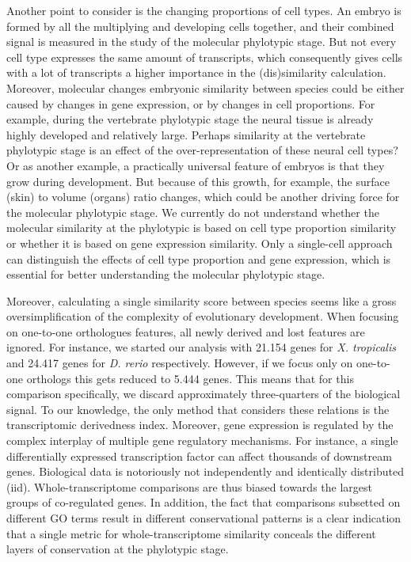 Another point to consider is the changing proportions of cell types. An embryo is formed by all the multiplying and developing cells together, and their combined signal is measured in the study of the molecular phylotypic stage. But not every cell type expresses the same amount of transcripts\cite{Kim2023, Percharde2017}, which consequently gives cells with a lot of transcripts a higher importance in the (dis)similarity calculation. Moreover, molecular changes embryonic similarity between species could be either caused by changes in gene expression, or by changes in cell proportions. For example, during the vertebrate phylotypic stage the neural tissue is already highly developed and relatively large. Perhaps similarity at the vertebrate phylotypic stage is an effect of the over-representation of these neural cell types? Or as another example, a practically universal feature of embryos is that they grow during development. But because of this growth, for example, the surface (skin) to volume (organs) ratio changes, which could be another driving force for the molecular phylotypic stage. We currently do not understand whether the molecular similarity at the phylotypic is based on cell type proportion similarity or whether it is based on gene expression similarity. Only a single-cell approach can distinguish the effects of cell type proportion and gene expression, which is essential for better understanding the molecular phylotypic stage.

Moreover, calculating a single similarity score between species seems like a gross oversimplification of the complexity of evolutionary development. When focusing on one-to-one orthologues features, all newly derived and lost features are ignored. For instance, we started our analysis with 21.154 genes for \textit{X. tropicalis} and 24.417 genes for \textit{D. rerio} respectively. However, if we focus only on one-to-one orthologs this gets reduced to 5.444 genes. This means that for this comparison specifically, we discard approximately three-quarters of the biological signal. To our knowledge, the only method that considers these relations is the transcriptomic derivedness index\cite{Leong2021}. Moreover, gene expression is regulated by the complex interplay of multiple gene regulatory mechanisms. For instance, a single differentially expressed transcription factor can affect thousands of downstream genes. Biological data is notoriously not independently and identically distributed (iid). Whole-transcriptome comparisons are thus biased towards the largest groups of co-regulated genes. In addition, the fact that comparisons subsetted on different GO terms result in different conservational patterns is a clear indication that a single metric for whole-transcriptome similarity conceals the different layers of conservation at the phylotypic stage\cite{Malik2017,Gildor2019,Onimaru2021}.

